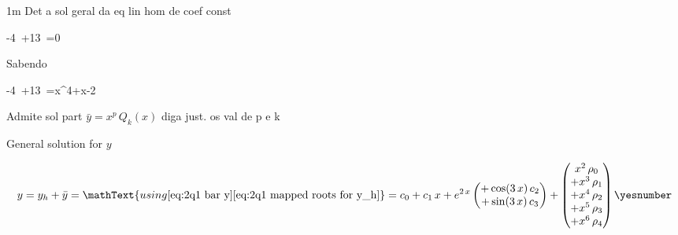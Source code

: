 \documentclass["AM3C-tests_resolutions.tex"]{subfiles}
\begin{document}
\begin{questionBox}1m{} %
  Det a sol geral da eq lin hom de coef const
  \begin{BM}
    -4\,
    +13\,
    =0
  \end{BM}
  Sabendo
  \begin{BM}
    -4\,
    +13\,
    =x^4+x-2
  \end{BM}
  Admite sol part \(\bar{y}=x^p\,Q_k(x)\) diga just. os val de p e k
  


  General solution for \(y\)
  \begin{tcolorbox}
    \begin{gather*}
      y
      = y_h 
      + \bar{y}
      = \mathText{using 
        \eqref{eq:2q1 bar y}
        \eqref{eq:2q1 mapped roots for y_h}
      }
      = c_0+c_1\,x
      + e^{2\,x}
      \begin{pmatrix}
        + \cos(3\,x)\,c_2
        \\
        + \sin(3\,x)\,c_3
      \end{pmatrix}
      + \begin{pmatrix}
        x^2\,\rho_0
        \\+ x^3\,\rho_1
        \\+ x^4\,\rho_2
        \\+ x^5\,\rho_3
        \\+ x^6\,\rho_4
      \end{pmatrix}
      \yesnumber\label{eq:2q1 answer}
    \end{gather*}
  \end{tcolorbox}




\end{questionBox}
\end{document}
